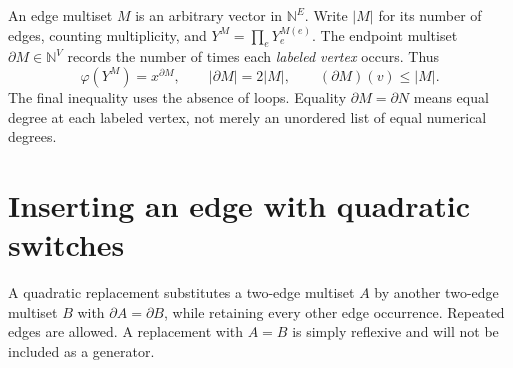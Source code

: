 \documentclass[11pt,letterpaper]{article}
\newcommand{\N}{\mathbb N}
\newcommand{\xM}[1]{Y^{#1}}
\newcommand{\dd}{\partial}
\begin{document}
An edge multiset $M$ is an arbitrary vector in $\N^E$. Write $|M|$ for
its number of edges, counting multiplicity, and $\xM{M}=\prod_eY_e^{M(e)}$.
The endpoint multiset $\dd M\in\N^V$ records the number of times each
\emph{labeled vertex} occurs. Thus
\[
 \varphi(\xM{M})=x^{\dd M},\qquad
 |\dd M|=2|M|,\qquad (\dd M)(v)\leq |M|.
\]
The final inequality uses the absence of loops. Equality $\dd M=\dd N$
means equal degree at each labeled vertex, not merely an unordered list of
equal numerical degrees.

\newpage
\section{Inserting an edge with quadratic switches}
A quadratic replacement substitutes a two-edge multiset $A$ by another
two-edge multiset $B$ with $\dd A=\dd B$, while retaining every other edge
occurrence. Repeated edges are allowed. A replacement with $A=B$ is simply
reflexive and will not be included as a generator.
\end{document}
